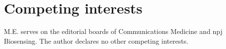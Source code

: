 \documentclass[11pt]{article}
\begin{document}
\section*{Competing interests}
M.E. serves on the editorial boards of Communications Medicine and npj Biosensing. The author declares no other competing interests.
\begingroup\small\setlength{\bibsep}{2pt}\endgroup
\end{document}
